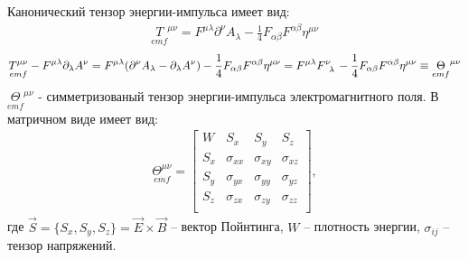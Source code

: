 \documentclass[__main__.tex]{subfiles}
\begin{document}
Канонический тензор энергии-импульса имеет вид:
\begin{gather*}
    \underset{emf}{T}^{\mu\nu} = F^{\mu\lambda}\partial^\nu A_\lambda - \frac{1}{4}F_{\alpha\beta}F^{\alpha\beta}\eta^{\mu\nu}
\end{gather*}
\begin{gather*}
    \underset{emf}{T^{\mu\nu}}
    -
    F^{\mu\lambda}\partial_\lambda A^\nu
    =
    F^{\mu\lambda}(\partial^\nu A_\lambda
    -
    \partial_\lambda A^\nu)
    -
    \frac{1}{4}F_{\alpha\beta}F^{\alpha\beta}\eta^{\mu\nu}
    =
    F^{\mu\lambda}F\indices{^\nu_\lambda}
    -
    \frac{1}{4}F_{\alpha\beta}F^{\alpha\beta}\eta^{\mu\nu}
    \equiv
    \underset{emf}{\Theta}^{\mu\nu}
\end{gather*}
$\underset{emf}{\Theta}^{\mu\nu}$ - симметризованый тензор энергии-импульса электромагнитного поля. В матричном виде имеет вид:
\begin{gather*}
\underset{emf}{\Theta^{\mu\nu}} =
\left[
\begin{array}{cccc}
W & S_x & S_y & S_z \\
S_x & \sigma_{xx} & \sigma_{xy} & \sigma_{xz} \\
S_y & \sigma_{yx} & \sigma_{yy} & \sigma_{yz} \\
S_z & \sigma_{zx} & \sigma_{zy} & \sigma_{zz} \\
\end{array}
\right],
\end{gather*}
где $\vec{S}=\{S_x,S_y,S_z\}=\vec{E}\times\vec{B}$ -- вектор Пойнтинга, $W$ -- плотность энергии, $\sigma_{ij}$ -- тензор напряжений.
\end{document}
